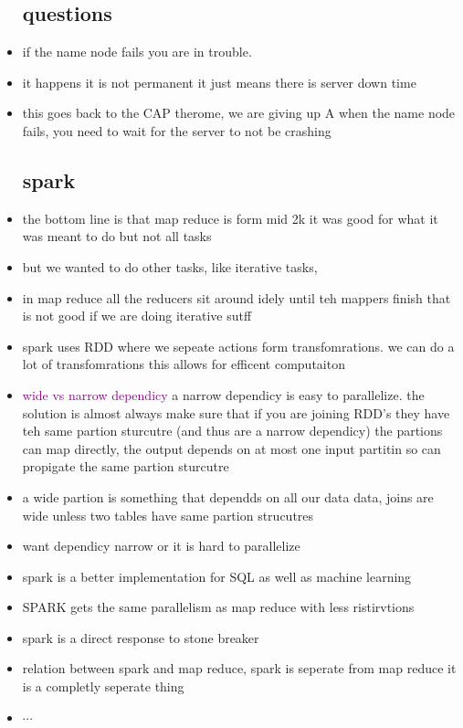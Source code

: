 \documentclass{article}
\begin{document}
\begin{itemize}
\subsection*{questions}
\item if the name node fails you are in trouble. 
\item it happens it is not permanent it just means there is server down time 
\item this goes back to the CAP therome, we are giving up A when the name node fails, you need to wait for the server to not be crashing 
\subsection*{spark}
    \item the bottom line is that map reduce is form mid 2k it was good for what it was meant to do but not all tasks 
    \item but we wanted to do other tasks, like iterative tasks, 
    \item in map reduce all the reducers sit around idely until teh mappers finish that is not good if we are doing iterative sutff 
    \item spark uses RDD where we sepeate actions form transfomrations. we can do a lot of transfomrations this allows for efficent computaiton 
    \item \textcolor{purple}{wide vs narrow dependicy} a narrow dependicy is easy to parallelize. the solution is almost always make sure that if you are joining RDD's they have teh same partion sturcutre (and thus are a narrow dependicy) the partions can map directly, the output depends on at most one input partitin so can propigate the same partion sturcutre
    \item a wide partion is something that dependds on all our data data, joins are wide unless two tables have same partion strucutres 
    \item want dependicy narrow or it is hard to parallelize 
    \item spark is a better implementation for SQL  as well as machine learning 
    \item SPARK gets the same parallelism as map reduce with less ristirvtions 
    \item spark is a direct response to stone breaker
    \item relation between spark and map reduce, spark is seperate from map reduce it is a completly seperate thing 
    \item $\cdots$

\end{itemize}
\end{document}

